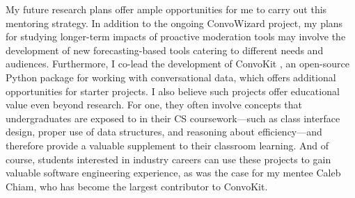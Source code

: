 \documentclass[12pt,letterpaper]{article}
\newcommand\ugradclosing\laresearchclosing
\newcommand\ugradclosing\genresearchclosing
\begin{document}
My future research plans offer ample opportunities for me to carry out this mentoring strategy.
In addition to the ongoing ConvoWizard project, my plans for studying longer-term impacts of proactive moderation tools may involve the development of new forecasting-based tools catering to different needs and audiences.
Furthermore, I co-lead the development of ConvoKit \cite{chang_convokit_2020}, an open-source Python package for working with conversational data, which offers additional opportunities for starter projects.
I also believe such projects offer educational value even beyond research.
For one, they often involve concepts that undergraduates are exposed to in their CS coursework---such as class interface design, proper use of data structures, and reasoning about efficiency---and therefore provide a valuable supplement to their classroom learning.
And of course, students interested in industry careers can use these projects to gain valuable software engineering experience, as was the case for my mentee Caleb Chiam, who has become the largest contributor to ConvoKit.
\ugradclosing

\vspace{0.5\baselineskip}
\printbibliography
\end{document}
